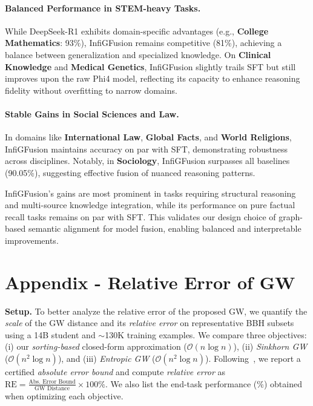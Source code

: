\documentclass{article}
\begin{document}
\paragraph{Balanced Performance in STEM-heavy Tasks.}
While DeepSeek-R1 exhibits domain-specific advantages (e.g., \textbf{College Mathematics}: 93\%), InfiGFusion remains competitive (81\%), achieving a balance between generalization and specialized knowledge. On \textbf{Clinical Knowledge} and \textbf{Medical Genetics}, InfiGFusion slightly trails SFT but still improves upon the raw Phi4 model, reflecting its capacity to enhance reasoning fidelity without overfitting to narrow domains.

\paragraph{Stable Gains in Social Sciences and Law.}
In domains like \textbf{International Law}, \textbf{Global Facts}, and \textbf{World Religions}, InfiGFusion maintains accuracy on par with SFT, demonstrating robustness across disciplines. Notably, in \textbf{Sociology}, InfiGFusion surpasses all baselines (90.05\%), suggesting effective fusion of nuanced reasoning patterns.

InfiGFusion’s gains are most prominent in tasks requiring structural reasoning and multi-source knowledge integration, while its performance on pure factual recall tasks remains on par with SFT. This validates our design choice of graph-based semantic alignment for model fusion, enabling balanced and interpretable improvements.

\section{Appendix - Relative Error of GW}
\label{sec:rebuttal-gw-scale}

\textbf{Setup.}
To better analyze the relative error of the proposed GW, we quantify the \emph{scale} of the GW distance and its \emph{relative error} on representative BBH subsets using a 14B student and $\sim$130K training examples. 
We compare three objectives: (i) our \textit{sorting-based} closed-form approximation ($\mathcal{O}(n\log n)$), (ii) \textit{Sinkhorn GW} ($\mathcal{O}(n^2\log n)$), and (iii) \textit{Entropic GW} ($\mathcal{O}(n^2\log n)$).
Following~\cite{scetbon2022linear, rioux2024entropic}, we report a certified \emph{absolute error bound} and compute \emph{relative error} as 
$\mathrm{RE}=\frac{\text{Abs.\ Error Bound}}{\text{GW Distance}}\times 100\%$.
We also list the end-task performance (\%) obtained when optimizing each objective.
\end{document}
